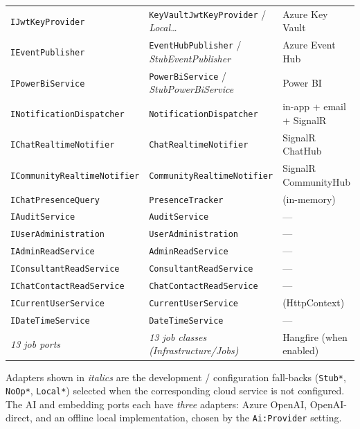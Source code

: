 \documentclass[11pt,a4paper]{article}
\begin{document}
\begin{longtable}{@{}p{4.3cm}p{6.8cm}p{3.4cm}@{}}
\texttt{IJwtKeyProvider} & \texttt{KeyVaultJwtKeyProvider} / \emph{Local\dots} & Azure Key Vault\\
\texttt{IEventPublisher} & \texttt{EventHubPublisher} / \emph{StubEventPublisher} & Azure Event Hub\\
\texttt{IPowerBiService} & \texttt{PowerBiService} / \emph{StubPowerBiService} & Power BI\\
\texttt{INotificationDispatcher} & \texttt{NotificationDispatcher} & in-app + email + SignalR\\
\texttt{IChatRealtimeNotifier} & \texttt{ChatRealtimeNotifier} & SignalR ChatHub\\
\texttt{ICommunityRealtimeNotifier} & \texttt{CommunityRealtimeNotifier} & SignalR CommunityHub\\
\texttt{IChatPresenceQuery} & \texttt{PresenceTracker} & (in-memory)\\
\texttt{IAuditService} & \texttt{AuditService} & ---\\
\texttt{IUserAdministration} & \texttt{UserAdministration} & ---\\
\texttt{IAdminReadService} & \texttt{AdminReadService} & ---\\
\texttt{IConsultantReadService} & \texttt{ConsultantReadService} & ---\\
\texttt{IChatContactReadService} & \texttt{ChatContactReadService} & ---\\
\texttt{ICurrentUserService} & \texttt{CurrentUserService} & (HttpContext)\\
\texttt{IDateTimeService} & \texttt{DateTimeService} & ---\\
\textit{13 job ports} & \textit{13 job classes (Infrastructure/Jobs)} & Hangfire (when enabled)\\
\bottomrule
\end{longtable}
\noindent Adapters shown in \emph{italics} are the development / configuration
fall-backs (\texttt{Stub*}, \texttt{NoOp*}, \texttt{Local*}) selected when the
corresponding cloud service is not configured. The AI and embedding ports each
have \emph{three} adapters: Azure OpenAI, OpenAI-direct, and an offline local
implementation, chosen by the \texttt{Ai:Provider} setting.
\end{document}
